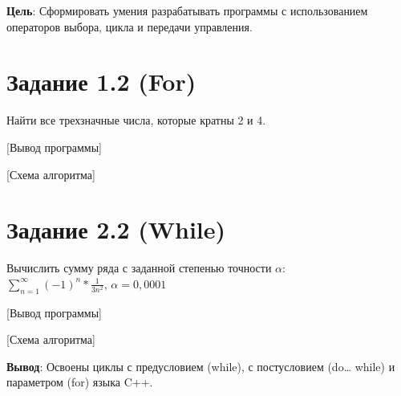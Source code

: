 \documentclass{bsuir}
\begin{document}

\textbf{Цель}: Сформировать умения разрабатывать программы с использованием
операторов выбора, цикла и передачи управления.

\section*{Задание 1.2 (For)}

Найти все трехзначные числа, которые кратны 2 и 4.


[Вывод программы]

[Схема алгоритма]

\section*{Задание 2.2 (While)}

Вычислить сумму ряда с заданной степенью точности $\alpha$:\\$\displaystyle
\sum_{n=1}^{\infty}(-1)^n*\frac{1}{3n^2}$, $\alpha=0,0001$


[Вывод программы]

[Схема алгоритма]

\textbf{Вывод}: Освоены циклы с предусловием (while), с постусловием (do\ldots
while) и параметром (for) языка C++.
\end{document}
